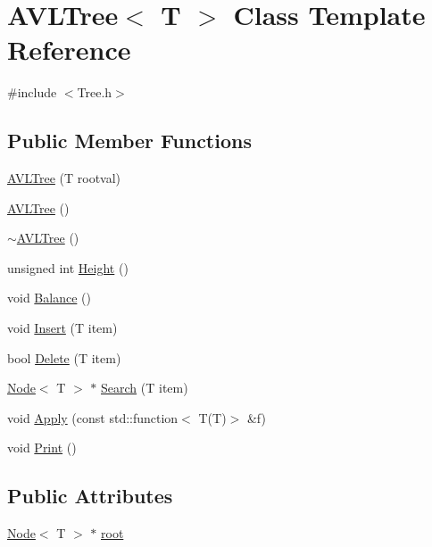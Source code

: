 \hypertarget{class_a_v_l_tree}{}\section{A\+V\+L\+Tree$<$ T $>$ Class Template Reference}
\label{class_a_v_l_tree}


{\ttfamily \#include $<$Tree.\+h$>$}

\subsection*{Public Member Functions}
\begin{DoxyCompactItemize}
\item 
\hyperlink{class_a_v_l_tree_aa92f37ed71cd2da834bfe21fed0df18e}{A\+V\+L\+Tree} (T rootval)
\item 
\hyperlink{class_a_v_l_tree_a9fab28b32e97ffc5e0f1a4ed3d9823b2}{A\+V\+L\+Tree} ()
\item 
\hyperlink{class_a_v_l_tree_ae7bb44a235074a48d817acbc32846ae7}{$\sim$\+A\+V\+L\+Tree} ()
\item 
unsigned int \hyperlink{class_a_v_l_tree_ad5560dc291c57ef2646e33f265c20a54}{Height} ()
\item 
void \hyperlink{class_a_v_l_tree_a76f21ced7264f2017e6bdbe525855722}{Balance} ()
\item 
void \hyperlink{class_a_v_l_tree_abba774bea66f9b03ff66a406b9cdd65b}{Insert} (T item)
\item 
bool \hyperlink{class_a_v_l_tree_aadba0f22d2ef0154a66079fe5c32021a}{Delete} (T item)
\item 
\hyperlink{class_node}{Node}$<$ T $>$ $\ast$ \hyperlink{class_a_v_l_tree_a84b5fc040fed66040bd15b97ebba3ca1}{Search} (T item)
\item 
void \hyperlink{class_a_v_l_tree_a4d16fca435b7af49afa489ab3a9f9931}{Apply} (const std\+::function$<$ T(T)$>$ \&f)
\item 
void \hyperlink{class_a_v_l_tree_a4c3538f1431692bb0ae6402f9e1564f1}{Print} ()
\end{DoxyCompactItemize}
\subsection*{Public Attributes}
\begin{DoxyCompactItemize}
\item 
\hyperlink{class_node}{Node}$<$ T $>$ $\ast$ \hyperlink{class_a_v_l_tree_a12af214b02aa42b44254eca52bc0ea59}{root}
\end{DoxyCompactItemize}


